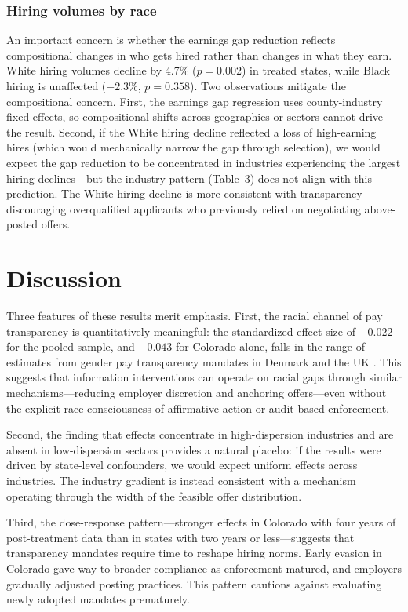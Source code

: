 \documentclass[12pt]{article}
\begin{document}
\subsubsection*{Hiring volumes by race} An important concern is whether the earnings gap reduction reflects compositional changes in who gets hired rather than changes in what they earn. White hiring volumes decline by 4.7\% ($p = 0.002$) in treated states, while Black hiring is unaffected ($-2.3\%$, $p = 0.358$). Two observations mitigate the compositional concern. First, the earnings gap regression uses county-industry fixed effects, so compositional shifts across geographies or sectors cannot drive the result. Second, if the White hiring decline reflected a loss of high-earning hires (which would mechanically narrow the gap through selection), we would expect the gap reduction to be concentrated in industries experiencing the largest hiring declines---but the industry pattern (Table~3) does not align with this prediction. The White hiring decline is more consistent with transparency discouraging overqualified applicants who previously relied on negotiating above-posted offers.

\section{Discussion}

Three features of these results merit emphasis. First, the racial channel of pay transparency is quantitatively meaningful: the standardized effect size of $-0.022$ for the pooled sample, and $-0.043$ for Colorado alone, falls in the range of estimates from gender pay transparency mandates in Denmark \citep{bennedsen2022firms} and the UK \citep{duchini2024pay}. This suggests that information interventions can operate on racial gaps through similar mechanisms---reducing employer discretion and anchoring offers---even without the explicit race-consciousness of affirmative action or audit-based enforcement.

Second, the finding that effects concentrate in high-dispersion industries and are absent in low-dispersion sectors provides a natural placebo: if the results were driven by state-level confounders, we would expect uniform effects across industries. The industry gradient is instead consistent with a mechanism operating through the width of the feasible offer distribution.

Third, the dose-response pattern---stronger effects in Colorado with four years of post-treatment data than in states with two years or less---suggests that transparency mandates require time to reshape hiring norms. Early evasion in Colorado \citep{hansen2024pay} gave way to broader compliance as enforcement matured, and employers gradually adjusted posting practices. This pattern cautions against evaluating newly adopted mandates prematurely.
\end{document}
